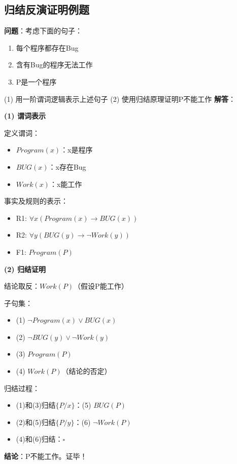 \subsection{归结反演证明例题}

\begin{examplebox}
\textbf{问题}：考虑下面的句子：
\begin{enumerate}[itemsep=0pt]
    \item 每个程序都存在Bug
    \item 含有Bug的程序无法工作
    \item P是一个程序
\end{enumerate}
(1) 用一阶谓词逻辑表示上述句子
(2) 使用归结原理证明P不能工作
\tcblower
\textbf{解答}：

\textbf{(1) 谓词表示}

定义谓词：
\begin{itemize}[itemsep=0pt]
    \item $Program(x)$：x是程序
    \item $BUG(x)$：x存在Bug
    \item $Work(x)$：x能工作
\end{itemize}

事实及规则的表示：
\begin{itemize}[itemsep=0pt]
    \item R1: $\forall x(Program(x) \to BUG(x))$
    \item R2: $\forall y(BUG(y) \to \neg Work(y))$
    \item F1: $Program(P)$
\end{itemize}

\textbf{(2) 归结证明}

结论取反：$Work(P)$（假设P能工作）

子句集：
\begin{itemize}[itemsep=0pt]
    \item (1) $\neg Program(x) \lor BUG(x)$
    \item (2) $\neg BUG(y) \lor \neg Work(y)$
    \item (3) $Program(P)$
    \item (4) $Work(P)$（结论的否定）
\end{itemize}

归结过程：
\begin{itemize}[itemsep=0pt]
    \item (1)和(3)归结$\{P/x\}$：(5) $BUG(P)$
    \item (2)和(5)归结$\{P/y\}$：(6) $\neg Work(P)$
    \item (4)和(6)归结：$\square$
\end{itemize}

\textbf{结论}：P不能工作。证毕！
\end{examplebox}


